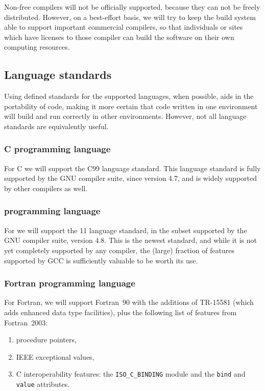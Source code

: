 \documentclass[draftmode,draftwater]{memarticle}
\begin{document}
Non-free compilers will not be officially supported, because they can
not be freely distributed. However, on a best-effort basis, we will try
to keep the build system able to support important commercial compilers,
so that individuals or sites which have licenses to those compiler can
build the software on their own computing resources.

\subsection{Language standards}

Using defined standards for the supported languages, when possible, aids
in the portability of code, making it more certain that code written in
one environment will build and run correctly in other environments.
However, not all language standards are equivalently useful.

\subsubsection{C programming language}

For C we will support the C99 language standard. This language standard
is fully supported by the GNU compiler suite, since version 4.7, and is widely
supported by other compilers as well.

\subsubsection{\cpp{} programming language}

For \cpp{} we will support the \cpp{}11 language standard, in the subset
supported by the GNU compiler suite, version 4.8. This is the newest
\cpp{} standard, and while it is not yet completely supported by any
compiler, the (large) fraction of features supported by GCC is
sufficiently valuable to be worth its use.

\subsubsection{Fortran programming language}

For Fortran, we will support Fortran~90 with the additions of TR-15581
(which adds enhanced data type facilities), plus the following list of
features from Fortran~2003:
\begin{enumerate}
\item procedure pointers,
\item IEEE exceptional values,
\item C interoperability features: the \texttt{ISO\_C\_BINDING} module
  and the \texttt{bind} and \texttt{value} attributes.
\end{enumerate}
\end{document}

